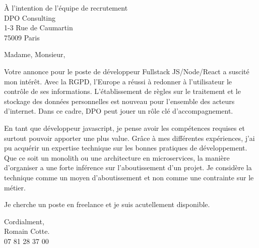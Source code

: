 \documentclass{letter}
\begin{document}
\begin{letter}{À l'intention de l'équipe de recrutement\\ DPO Consulting\\ 1-3 Rue de Caumartin\\75009 Paris}
\opening{Madame, Monsieur,}

Votre annonce pour le poste de développeur Fullstack JS/Node/React a suscité mon
intérêt. Avec la RGPD, l'Europe a réussi à redonner à l'utilisateur le contrôle
de ses informations. L'établissement de règles sur le traitement et le stockage des
données personnelles est nouveau pour l'ensemble des acteurs d'internet. Dans ce
cadre, DPO peut jouer un rôle clé d'accompagnement.

En tant que développeur javascript, je pense avoir les compétences requises et
surtout pouvoir apporter une plus value. Grâce à mes différentes expériences,
j'ai pu acquérir un expertise technique sur les bonnes pratiques de
développement. Que ce soit un monolith ou une architecture en microservices, la
manière d'organiser a une forte inférence sur l'aboutissement d'un projet. Je
considère la technique comme un moyen d'aboutissement et non comme une contrainte
sur le métier.

Je cherche un poste en freelance et je suis acutellement disponible.

\vspace{1cm}

Cordialment,\\
Romain Cotte. \\
07 81 28 37 00

\end{letter}
\end{document}

